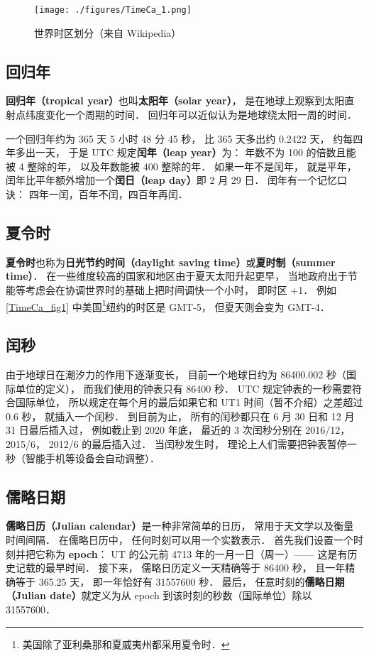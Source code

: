\begin{figure}[ht]
\centering
\texttt{[image: ./figures/TimeCa\_1.png]}
\caption{世界时区划分（来自 Wikipedia）} \label{TimeCa_fig1}
\end{figure}

\subsection{回归年}
\textbf{回归年（tropical year）}也叫\textbf{太阳年（solar year）}， 是在地球上观察到太阳直射点纬度变化一个周期的时间． 回归年可以近似认为是地球绕太阳一周的时间．

一个回归年约为 365 天 5 小时 48 分 45 秒， 比 365 天多出约 0.2422 天， 约每四年多出一天， 于是 UTC 规定\textbf{闰年（leap year）}为： 年数不为 100 的倍数且能被 4 整除的年， 以及年数能被 400 整除的年． 如果一年不是闰年， 就是平年， 闰年比平年额外增加一个\textbf{闰日（leap day）}即 2 月 29 日． 闰年有一个记忆口诀： 四年一闰，百年不闰，四百年再闰．

\subsection{夏令时}
\textbf{夏令时}也称为\textbf{日光节约时间（daylight saving time）}或\textbf{夏时制（summer time）}． 在一些维度较高的国家和地区由于夏天太阳升起更早， 当地政府出于节能等考虑会在协调世界时的基础上把时间调快一个小时， 即时区 +1． 例如\autoref{TimeCa_fig1} 中美国\footnote{美国除了亚利桑那和夏威夷州都采用夏令时．}纽约的时区是 GMT-5， 但夏天则会变为 GMT-4．

\subsection{闰秒}
由于地球日在潮汐力的作用下逐渐变长， 目前一个地球日约为 86400.002 秒（国际单位的定义）， 而我们使用的钟表只有 86400 秒． UTC 规定钟表的一秒需要符合国际单位， 所以规定在每个月的最后如果它和 UT1 时间（暂不介绍）之差超过 0.6 秒， 就插入一个闰秒． 到目前为止， 所有的闰秒都只在 6 月 30 日和 12 月 31 日最后插入过， 例如截止到 2020 年底， 最近的 3 次闰秒分别在 2016/12， 2015/6， 2012/6 的最后插入过． 当闰秒发生时， 理论上人们需要把钟表暂停一秒（智能手机等设备会自动调整）．

\subsection{儒略日期}

\textbf{儒略日历（Julian calendar）}是一种非常简单的日历， 常用于天文学以及衡量时间间隔． 在儒略日历中， 任何时刻可以用一个实数表示． 首先我们设置一个时刻并把它称为 \textbf{epoch}： UT 的公元前 4713 年的一月一日（周一）—— 这是有历史记载的最早时间． 接下来， 儒略日历定义一天精确等于 86400 秒， 且一年精确等于 365.25 天， 即一年恰好有 31557600 秒． 最后， 任意时刻的\textbf{儒略日期（Julian date）}就定义为从 epoch 到该时刻的秒数（国际单位）除以 31557600． 

